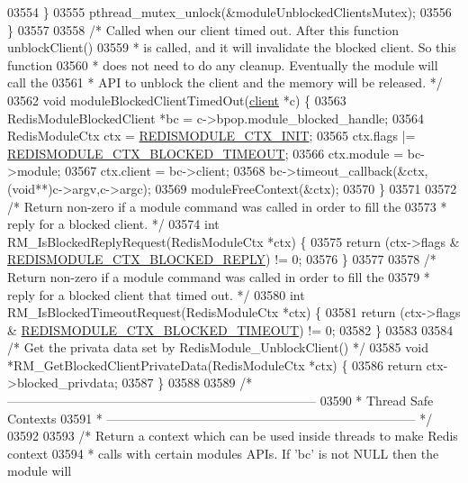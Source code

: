 \begin{DoxyCode}
{{{{{{{{{{03554     \}
03555     pthread\_mutex\_unlock(&moduleUnblockedClientsMutex);
03556 \}
03557 
03558 \textcolor{comment}{/* Called when our client timed out. After this function unblockClient()}
03559 \textcolor{comment}{ * is called, and it will invalidate the blocked client. So this function}
03560 \textcolor{comment}{ * does not need to do any cleanup. Eventually the module will call the}
03561 \textcolor{comment}{ * API to unblock the client and the memory will be released. */}
03562 \textcolor{keywordtype}{void} moduleBlockedClientTimedOut(\hyperlink{structclient}{client} *c) \{
03563     RedisModuleBlockedClient *bc = c->bpop.module\_blocked\_handle;
03564     RedisModuleCtx ctx = \hyperlink{module_8c_a7a80fb134c35b70c7cfe920ea1033bcd}{REDISMODULE\_CTX\_INIT};
03565     ctx.flags |= \hyperlink{module_8c_a28ea3db0137452d6b6cc025eefe28be7}{REDISMODULE\_CTX\_BLOCKED\_TIMEOUT};
03566     ctx.module = bc->module;
03567     ctx.client = bc->client;
03568     bc->timeout\_callback(&ctx,(\textcolor{keywordtype}{void}**)c->argv,c->argc);
03569     moduleFreeContext(&ctx);
03570 \}
03571 
03572 \textcolor{comment}{/* Return non-zero if a module command was called in order to fill the}
03573 \textcolor{comment}{ * reply for a blocked client. */}
03574 \textcolor{keywordtype}{int} RM\_IsBlockedReplyRequest(RedisModuleCtx *ctx) \{
03575     \textcolor{keywordflow}{return} (ctx->flags & \hyperlink{module_8c_a06323cb111581e0b8848943a08639a87}{REDISMODULE\_CTX\_BLOCKED\_REPLY}) != 0;
03576 \}
03577 
03578 \textcolor{comment}{/* Return non-zero if a module command was called in order to fill the}
03579 \textcolor{comment}{ * reply for a blocked client that timed out. */}
03580 \textcolor{keywordtype}{int} RM\_IsBlockedTimeoutRequest(RedisModuleCtx *ctx) \{
03581     \textcolor{keywordflow}{return} (ctx->flags & \hyperlink{module_8c_a28ea3db0137452d6b6cc025eefe28be7}{REDISMODULE\_CTX\_BLOCKED\_TIMEOUT}) != 0;
03582 \}
03583 
03584 \textcolor{comment}{/* Get the privata data set by RedisModule\_UnblockClient() */}
03585 \textcolor{keywordtype}{void} *RM\_GetBlockedClientPrivateData(RedisModuleCtx *ctx) \{
03586     \textcolor{keywordflow}{return} ctx->blocked\_privdata;
03587 \}
03588 
03589 \textcolor{comment}{/* --------------------------------------------------------------------------}
03590 \textcolor{comment}{ * Thread Safe Contexts}
03591 \textcolor{comment}{ * -------------------------------------------------------------------------- */}
03592 
03593 \textcolor{comment}{/* Return a context which can be used inside threads to make Redis context}
03594 \textcolor{comment}{ * calls with certain modules APIs. If 'bc' is not NULL then the module will}
}}}}}}}}}}
\end{DoxyCode}
